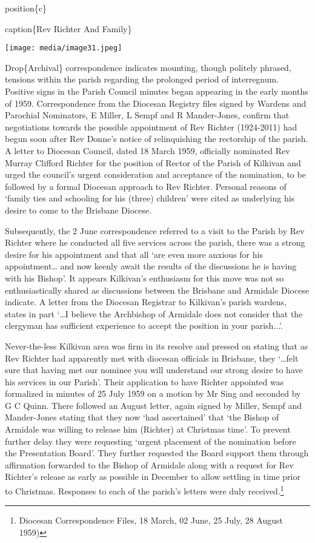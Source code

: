 position\{c\}

caption\{Rev Richter And Family\}

\texttt{[image: media/image31.jpeg]}

Drop\{Archival\} correspondence indicates mounting, though politely phrased, tensions within the parish regarding the prolonged period of interregnum. Positive signs in the Parish Council minutes began appearing in the early months of 1959. Correspondence from the Diocesan Registry files signed by Wardens and Parochial Nominators, E Miller, L Sempf and R Mander-Jones, confirm that negotiations towards the possible appointment of Rev Richter (1924-2011) had begun soon after Rev Donne's notice of relinquishing the rectorship of the parish. A letter to Diocesan Council, dated 18 March 1959, officially nominated Rev Murray Clifford Richter for the position of Rector of the Parish of Kilkivan and urged the council's urgent consideration and acceptance of the nomination, to be followed by a formal Diocesan approach to Rev Richter. Personal reasons of `family ties and schooling for his (three) children' were cited as underlying his desire to come to the Brisbane Diocese.

Subsequently, the 2 June correspondence referred to a visit to the Parish by Rev Richter where he conducted all five services across the parish, there was a strong desire for his appointment and that all `are even more anxious for his appointment\ldots{} and now keenly await the results of the discussions he is having with his Bishop'. It appears Kilkivan's enthusiasm for this move was not so enthusiastically shared as discussions between the Brisbane and Armidale Diocese indicate. A letter from the Diocesan Registrar to Kilkivan's parish wardens, states in part `\ldots I believe the Archbishop of Armidale does not consider that the clergyman has sufficient experience to accept the position in your parish...'.

Never-the-less Kilkivan area was firm in its resolve and pressed on stating that as Rev Richter had apparently met with diocesan officials in Brisbane, they `\ldots felt sure that having met our nominee you will understand our strong desire to have his services in our Parish'. Their application to have Richter appointed was formalized in minutes of 25 July 1959 on a motion by Mr Sing and seconded by G C Quinn. There followed an August letter, again signed by Miller, Sempf and Mander-Jones stating that they now `had ascertained' that `the Bishop of Armidale was willing to release him (Richter) at Christmas time'. To prevent further delay they were requesting `urgent placement of the nomination before the Presentation Board'. They further requested the Board support them through affirmation forwarded to the Bishop of Armidale along with a request for Rev Richter's release as early as possible in December to allow settling in time prior to Christmas. Responses to each of the parish's letters were duly received.\footnote{Diocesan Correspondence Files, 18 March, 02 June, 25 July, 28 August 1959)}

